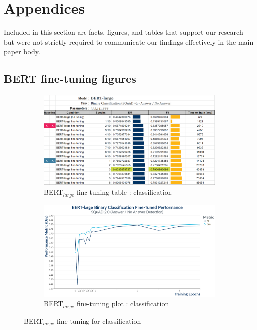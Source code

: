 \appendix

\section{Appendices}
\label{sec:appendix}

Included in this section are facts, figures, and tables that support our research but were not strictly required to communicate our findings effectively in the main paper body.

\subsection{BERT fine-tuning figures}

\vspace*{15pt}%

\begin{figure}[ht]
	\centering
	\begin{subfigure}{0.95\textwidth}%
		\centering
		\includegraphics[width=\linewidth]{images/classification/BERT_Large_Training.png}%
		\caption{BERT$_{large}$ fine-tuning table : classification}
	\end{subfigure}%

	\vspace*{8pt}%
	
	\begin{subfigure}{0.96\textwidth}%
		\centering
		\includegraphics[width=\linewidth]{images/BinaryClassification_BERT_Training_Performance_plot.png}%
		\caption{BERT$_{large}$ fine-tuning plot : classification}
	\end{subfigure}%
	\caption{\label{apdx:BERT_fine_tuning_classification}BERT$_{large}$ fine-tuning for classification}
\end{figure}

